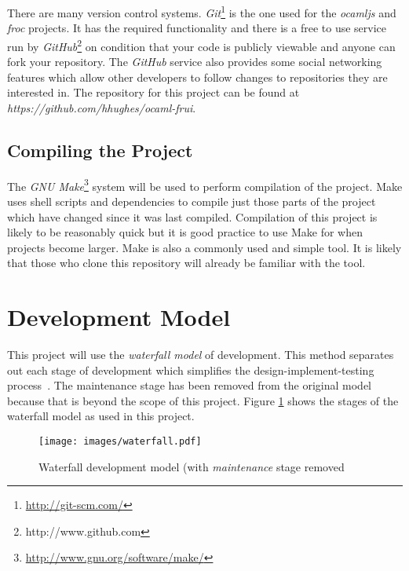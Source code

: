 There are many version control systems. \emph{Git}\footnote{\url{http://git-scm.com/}} is the one used for the \emph{ocamljs} and \emph{froc} projects. It has the required functionality and there is a free to use service run by \emph{GitHub}\footnote{http://www.github.com} on condition that your code is publicly viewable and anyone can fork your repository. The \emph{GitHub} service also provides some social networking features which allow other developers to follow changes to repositories they are interested in. The repository for this project can be found at \emph{https://github.com/hhughes/ocaml-frui}.

\subsection{Compiling the Project}
The \emph{GNU Make}\footnote{\url{http://www.gnu.org/software/make/}} system will be used to perform compilation of the project. Make uses shell scripts and dependencies to compile just those parts of the project which have changed since it was last compiled. Compilation of this project is likely to be reasonably quick but it is good practice to use Make for when projects become larger. Make is also a commonly used and simple tool. It is likely that those who clone this repository will already be familiar with the tool.

\section{Development Model}
This project will use the \emph{waterfall model} of development. This method separates out each stage of development which simplifies the design-implement-testing process~\cite{bib:royce}. The maintenance stage has been removed from the original model because that is beyond the scope of this project. Figure \ref{fig:waterfall} shows the stages of the waterfall model as used in this project.

\begin{figure}
  \centering
  \texttt{[image: images/waterfall.pdf]}
  \caption{Waterfall development model (with \emph{maintenance} stage removed}
  \label{fig:waterfall}
\end{figure}

